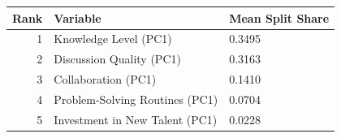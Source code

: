 
\begin{tabular}{rll}
\toprule
Rank & Variable & Mean Split Share\\
\midrule
1 & Knowledge Level (PC1) & 0.3495\\
2 & Discussion Quality (PC1) & 0.3163\\
3 & Collaboration (PC1) & 0.1410\\
4 & Problem-Solving Routines (PC1) & 0.0704\\
5 & Investment in New Talent (PC1) & 0.0228\\
\bottomrule
\end{tabular}
